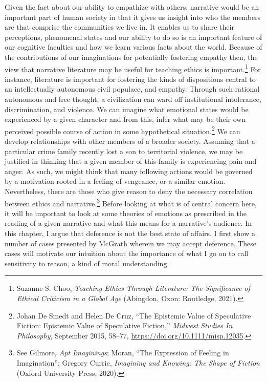 \documentclass[
  12pt,
]{book}
\theoremstyle{definition}
\theoremstyle{definition}
\theoremstyle{definition}
\theoremstyle{definition}
\theoremstyle{remark}
\begin{document}
Given the fact about our ability to empathize with others, narrative would be an important part of human society in that it gives us insight into who the members are that comprise the communities we live in. It enables us to share their perceptions, phenomenal states and our ability to do so is an important feature of our cognitive faculties and how we learn various facts about the world. Because of the contributions of our imaginations for potentially fostering empathy then, the view that narrative literature may be useful for teaching ethics is important.\footnote{Suzanne S. Choo, \emph{Teaching Ethics Through Literature: The Significance of Ethical Criticism in a Global Age} (Abingdon, Oxon: Routledge, 2021).} For instance, literature is important for fostering the kinds of dispositions central to an intellectually autonomous civil populace, and empathy. Through such rational autonomous and free thought, a civilization can ward off institutional intolerance, discrimination, and violence. We can imagine what emotional states would be experienced by a given character and from this, infer what may be their own perceived possible course of action in some hypothetical situation.\footnote{Johan De Smedt and Helen De Cruz, {``The Epistemic Value of Speculative Fiction: Epistemic Value of Speculative Fiction,''} \emph{Midwest Studies In Philosophy}, September 2015, 58--77, \url{https://doi.org/10.1111/misp.12035}.} We can develop relationships with other members of a broader society. Assuming that a particular crime family recently lost a son to territorial violence, we may be justified in thinking that a given member of this family is experiencing pain and anger. As such, we might think that many following actions would be governed by a motivation rooted in a feeling of vengeance, or a similar emotion. Nevertheless, there are those who give reason to deny the necessary correlation between ethics and narrative.\footnote{See Gilmore, \emph{Apt {Imaginings}}; Moran, {``The {Expression} of {Feeling} in {Imagination}''}; Gregory Currie, \emph{Imagining and Knowing: The Shape of Fiction} (Oxford University Press, 2020).} Before looking at what is of central concern here, it will be important to look at some theories of emotions as prescribed in the reading of a given narrative and what this means for a narrative's audience. In this chapter, I argue that deference is not the best state of affairs. I first show a number of cases presented by McGrath wherein we may accept deference. These cases will motivate our intuition about the importance of what I go on to call sensitivity to reason, a kind of moral understanding.
\end{document}
